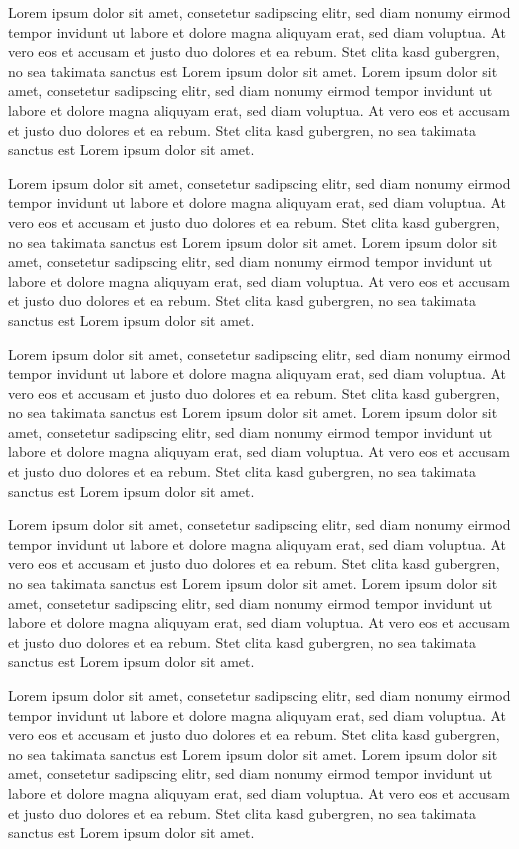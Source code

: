 \documentclass{scrbook}
\begin{document}
Lorem ipsum dolor sit amet, consetetur sadipscing elitr, sed diam
nonumy eirmod tempor invidunt ut labore et dolore magna aliquyam erat,
sed diam voluptua. At vero eos et accusam et justo duo dolores et
ea rebum. Stet clita kasd gubergren, no sea takimata sanctus est Lorem
ipsum dolor sit amet. Lorem ipsum dolor sit amet, consetetur sadipscing
elitr, sed diam nonumy eirmod tempor invidunt ut labore et dolore
magna aliquyam erat, sed diam voluptua. At vero eos et accusam et
justo duo dolores et ea rebum. Stet clita kasd gubergren, no sea takimata
sanctus est Lorem ipsum dolor sit amet.

Lorem ipsum dolor sit amet, consetetur sadipscing elitr, sed diam
nonumy eirmod tempor invidunt ut labore et dolore magna aliquyam erat,
sed diam voluptua. At vero eos et accusam et justo duo dolores et
ea rebum. Stet clita kasd gubergren, no sea takimata sanctus est Lorem
ipsum dolor sit amet. Lorem ipsum dolor sit amet, consetetur sadipscing
elitr, sed diam nonumy eirmod tempor invidunt ut labore et dolore
magna aliquyam erat, sed diam voluptua. At vero eos et accusam et
justo duo dolores et ea rebum. Stet clita kasd gubergren, no sea takimata
sanctus est Lorem ipsum dolor sit amet.

Lorem ipsum dolor sit amet, consetetur sadipscing elitr, sed diam
nonumy eirmod tempor invidunt ut labore et dolore magna aliquyam erat,
sed diam voluptua. At vero eos et accusam et justo duo dolores et
ea rebum. Stet clita kasd gubergren, no sea takimata sanctus est Lorem
ipsum dolor sit amet. Lorem ipsum dolor sit amet, consetetur sadipscing
elitr, sed diam nonumy eirmod tempor invidunt ut labore et dolore
magna aliquyam erat, sed diam voluptua. At vero eos et accusam et
justo duo dolores et ea rebum. Stet clita kasd gubergren, no sea takimata
sanctus est Lorem ipsum dolor sit amet.

Lorem ipsum dolor sit amet, consetetur sadipscing elitr, sed diam
nonumy eirmod tempor invidunt ut labore et dolore magna aliquyam erat,
sed diam voluptua. At vero eos et accusam et justo duo dolores et
ea rebum. Stet clita kasd gubergren, no sea takimata sanctus est Lorem
ipsum dolor sit amet. Lorem ipsum dolor sit amet, consetetur sadipscing
elitr, sed diam nonumy eirmod tempor invidunt ut labore et dolore
magna aliquyam erat, sed diam voluptua. At vero eos et accusam et
justo duo dolores et ea rebum. Stet clita kasd gubergren, no sea takimata
sanctus est Lorem ipsum dolor sit amet.

Lorem ipsum dolor sit amet, consetetur sadipscing elitr, sed diam
nonumy eirmod tempor invidunt ut labore et dolore magna aliquyam erat,
sed diam voluptua. At vero eos et accusam et justo duo dolores et
ea rebum. Stet clita kasd gubergren, no sea takimata sanctus est Lorem
ipsum dolor sit amet. Lorem ipsum dolor sit amet, consetetur sadipscing
elitr, sed diam nonumy eirmod tempor invidunt ut labore et dolore
magna aliquyam erat, sed diam voluptua. At vero eos et accusam et
justo duo dolores et ea rebum. Stet clita kasd gubergren, no sea takimata
sanctus est Lorem ipsum dolor sit amet.
\end{document}
